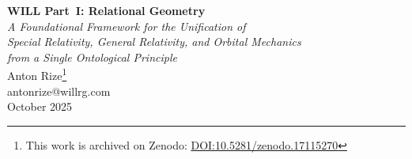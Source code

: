 \documentclass[10pt, a4paper]{article}
\begin{document}
\begin{center}
{\Large\bfseries WILL Part~I: Relational Geometry}\\[8pt]
{\itshape A Foundational Framework for the Unification of\\
Special Relativity, General Relativity, and Orbital Mechanics\\
from a Single Ontological Principle}\\[12pt]
{Anton Rize\thanks{This work is archived on Zenodo: \href{https://doi.org/10.5281/zenodo.17115270}{DOI:10.5281/zenodo.17115270}}}\\
{\small antonrize@willrg.com}\\[4pt]
{\small October 2025}
\end{center}

\vspace{6pt}
\end{document}
